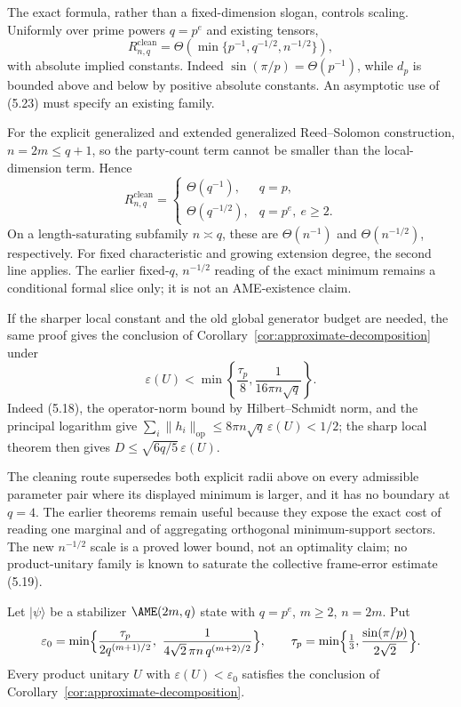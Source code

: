 The exact formula, rather than a fixed-dimension slogan, controls scaling.
Uniformly over prime powers \(q=p^e\) and existing tensors,
\[
 R^{\mathrm{clean}}_{n,q}
 =\Theta\!\left(\min\{p^{-1},q^{-1/2},n^{-1/2}\}\right),              \tag{5.23}
\]
with absolute implied constants.  Indeed
\(\sin(\pi/p)=\Theta(p^{-1})\), while \(d_p\) is bounded above and below
by positive absolute constants.  An asymptotic use of (5.23) must specify
an existing family.

For the explicit generalized and extended generalized Reed--Solomon
construction, \(n=2m\leq q+1\), so the party-count term cannot be smaller
than the local-dimension term.  Hence
\[
 R^{\mathrm{clean}}_{n,q}
 =\begin{cases}
   \Theta(q^{-1}),&q=p,\\
   \Theta(q^{-1/2}),&q=p^e,\ e\geq2.
  \end{cases}                                                        \tag{5.24}
\]
On a length-saturating subfamily \(n\asymp q\), these are
\(\Theta(n^{-1})\) and \(\Theta(n^{-1/2})\), respectively.  For fixed
characteristic and growing extension degree, the second line applies.
The earlier fixed-\(q\), \(n^{-1/2}\) reading of the exact minimum remains
a conditional formal slice only; it is not an AME-existence claim.

If the sharper local constant and the old global generator budget are
needed, the same proof gives the conclusion of
Corollary~\ref{cor:approximate-decomposition} under
\[
 \varepsilon(U)<\min\left\{
  \frac{\tau_p}{8},\frac1{16\pi n\sqrt q}
 \right\}.                                           \tag{5.25}
\]
Indeed (5.18), the operator-norm bound by Hilbert--Schmidt norm, and the
principal logarithm give
\(\sum_i\lVert h_i\rVert_{\mathrm{op}}
\leq8\pi n\sqrt q\,\varepsilon(U)<1/2\); the sharp local theorem then
gives \(D\leq\sqrt{6q/5}\,\varepsilon(U)\).

The cleaning route supersedes both explicit radii above on every admissible
parameter pair where its displayed minimum is larger, and it has no
boundary at \(q=4\).  The earlier theorems remain useful because they expose the exact
cost of reading one marginal and of aggregating orthogonal minimum-support
sectors.  The new \(n^{-1/2}\) scale is a proved lower bound, not an
optimality claim; no product-unitary family is known to saturate the
collective frame-error estimate (5.19).

\begin{theorem}
\label{thm:explicit-threshold}
Let \(\lvert\psi\rangle\) be a stabilizer \(\AME(2m,q)\) state with
\(q=p^e\), \(m\geq2\), \(n=2m\).  Put
\[
 \varepsilon_0=\min\Bigl\{
   \frac{\tau_p}{2q^{(m+1)/2}},\
   \frac1{4\sqrt2\,\pi n\,q^{(m+2)/2}}\Bigr\},
 \qquad
 \tau_p=\min\Bigl\{\tfrac13,\frac{\sin(\pi/p)}{2\sqrt2}\Bigr\}.
\]
Every product unitary \(U\) with \(\varepsilon(U)<\varepsilon_0\) satisfies
the conclusion of Corollary~\ref{cor:approximate-decomposition}.
\end{theorem}

